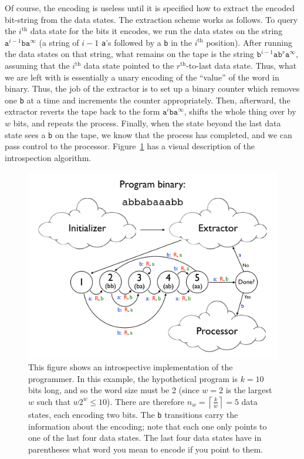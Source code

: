 \documentclass[11pt]{article}
\begin{document}
Of course, the encoding is useless until it is specified how to extract the encoded bit-string from the data states. The extraction scheme works as follows. To query the $i^\textrm{th}$ data state for the bits it encodes, we run the data states on the string $\texttt{a}^{i-1}\texttt{b}\texttt{a}^{\infty}$ (a string of $i-1$ \texttt{a}'s followed by a \texttt{b} in the $i^\textrm{th}$ position). After running the data states on that string, what remains on the tape is the string $\texttt{b}^{i-1}\texttt{a}\texttt{b}^r\texttt{a}^{\infty}$, assuming that the $i^\textrm{th}$ data state pointed to the $r^\textrm{th}$-to-last data state. Thus, what we are left with is essentially a unary encoding of the ``value'' of the word in binary. Thus, the job of the extractor is to set up a binary counter which removes one \texttt{b} at a time and increments the counter appropriately. Then, afterward, the extractor reverts the tape back to the form $\texttt{a}^i\texttt{b}\texttt{a}^{\infty}$, shifts the whole thing over by $w$ bits, and repeats the process. Finally, when the state beyond the last data state sees a \texttt{b} on the tape, we know that the process has completed, and we can pass control to the processor. Figure~\ref{fig:introspectprog} has a visual description of the introspection algorithm.

\begin{figure}
\begin{center}
\includegraphics[scale=0.42]{figs/introspectprog.png}
\caption{This figure shows an introspective implementation of the programmer. In this example, the hypothetical program is $k=10$ bits long, and so the word size must be 2 (since $w=2$ is the largest $w$ such that $w2^w \le 10$). There are therefore $n_w = \left \lceil{\frac{k}{w}}\right \rceil = 5$ data states, each encoding two bits. The \texttt{b} transitions carry the information about the encoding; note that each one only points to one of the last four data states. The last four data states have in parentheses what word you mean to encode if you point to them. \label{fig:introspectprog}}
\end{center}
\end{figure}
\end{document}
